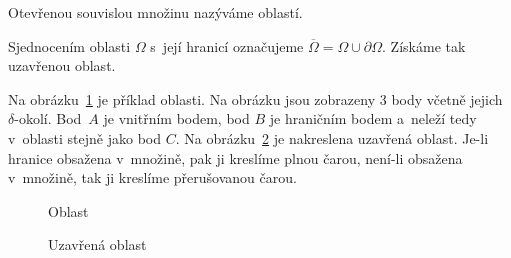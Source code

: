 \begin{fact}
Otevřenou souvislou množinu nazýváme oblastí.
\end{fact}

\begin{fact}
Sjednocením oblasti \(\Omega\) s~její hranicí označujeme \(\overline{\Omega} = \Omega \cup \partial \Omega\). Získáme tak uzavřenou oblast. 
\end{fact}

Na obrázku~\ref{img:oblast} je příklad oblasti. Na obrázku jsou zobrazeny 3 body včetně jejich \(\delta\)-okolí. Bod~\(A\) je vnitřním bodem, bod \(B\) je hraničním bodem a~neleží tedy v~oblasti stejně jako bod \(C\). Na obrázku~\ref{img:uzavrena_oblast} je nakreslena uzavřená oblast. Je-li hranice obsažena v~množině, pak ji kreslíme plnou čarou, není-li obsažena v~množině, tak ji kreslíme přerušovanou čarou.

\begin{figure}
\begin{center}
\caption{Oblast}
\end{center}
\label{img:oblast}
\end{figure}

\begin{figure}
\begin{center}
\caption{Uzavřená oblast}
\end{center}
\label{img:uzavrena_oblast}
\end{figure}

